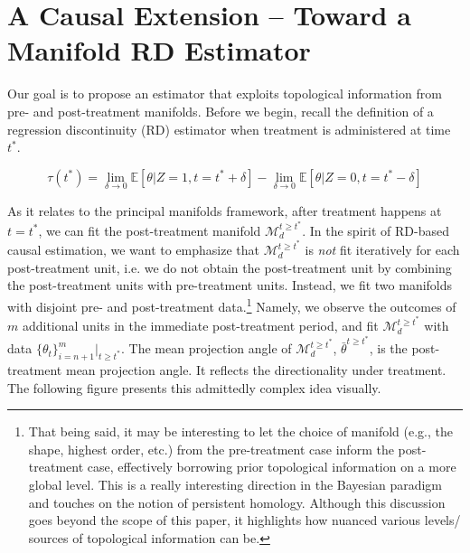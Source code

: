 \documentclass[twoside,11pt]{article}
\begin{document}
\section{A Causal Extension -- Toward a Manifold RD Estimator}\label{sc:causal}

Our goal is to propose an estimator that exploits topological information from pre- and post-treatment manifolds. Before we begin, recall the definition of a regression discontinuity (RD) estimator when treatment is administered at time $t^*$. 

\[
  \tau(t^*) = \lim_{\delta \rightarrow 0} \mathbb{E}[\theta | Z = 1, t = t^* + \delta] - \lim_{\delta \rightarrow 0} \mathbb{E}[\theta | Z = 0, t = t^* - \delta] 
\]

As it relates to the principal manifolds framework, after treatment happens at $t=t^*$, we can fit the post-treatment manifold $\mathcal{M}_d^{t \geq t^*}$. In the spirit of RD-based causal estimation, we want to emphasize that $\mathcal{M}_d^{t \geq t^*}$ is \textit{not} fit iteratively for each post-treatment unit, i.e. we do not obtain the post-treatment unit by combining the post-treatment units with pre-treatment units. Instead, we fit two manifolds with disjoint pre- and post-treatment data.\footnote{That being said, it may be interesting to let the choice of manifold (e.g., the shape, highest order, etc.) from the pre-treatment case inform the post-treatment case, effectively borrowing prior topological information on a more global level. This is a really interesting direction in the Bayesian paradigm and touches on the notion of persistent homology. Although this discussion goes beyond the scope of this paper, it highlights how nuanced various levels/ sources of topological information can be.} Namely, we observe the outcomes of $m$ additional units in the immediate post-treatment period, and fit $\mathcal{M}_d^{t \geq t^*}$ with data $\{\theta_{t}\}_{i=n+1}^{m}|_{t \geq t^*}$. The mean projection angle of $\mathcal{M}_d^{t \geq t^*}$, $\bar{\theta}^{t \geq t^*}$, is the post-treatment mean projection angle. It reflects the directionality under treatment. The following figure presents this admittedly complex idea visually. 
\end{document}
